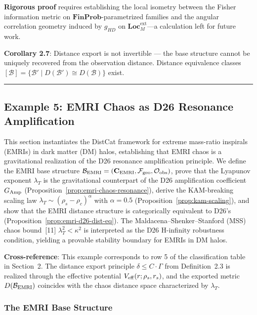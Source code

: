 \documentclass[
]{article}
\begin{document}
\textbf{Rigorous proof} requires establishing the local isometry between
the Fisher information metric on \(\mathbf{FinProb}\)-parametrized families
and the angular correlation geometry induced by \(g_{HD}\) on
\(\mathbf{Loc}_M^{\text{ext}}\)---a calculation left for future work.

\textbf{Corollary 2.7}: Distance export is not invertible --- the base
structure cannot be uniquely recovered from the observation distance.
Distance equivalence classes
\([\mathcal{B}] = \{\mathcal{B}' \mid D(\mathcal{B}') \cong D(\mathcal{B})\}\)
exist.

\begin{center}\rule{0.5\linewidth}{0.5pt}\end{center}


\subsection{Example 5: EMRI Chaos as D26 Resonance Amplification}\label{sec:example5-emri}

This section instantiates the DistCat framework for extreme mass-ratio inspirals (EMRIs) in dark matter (DM) halos, establishing that EMRI chaos is a gravitational realization of the D26 resonance amplification principle. We define the EMRI base structure $\mathcal{B}_{\rm EMRI} = (\mathbf{C}_{\rm EMRI}, \mathcal{F}_{\rm geo}, \mathcal{O}_{\rm obs})$, prove that the Lyapunov exponent $\lambda_T$ is the gravitational counterpart of the D26 amplification coefficient $G_{\rm Amp}$ (Proposition~\ref{prop:emri-chaos-resonance}), derive the KAM-breaking scaling law $\lambda_T \sim (\rho_s - \rho_c)^\alpha$ with $\alpha = 0.5$ (Proposition~\ref{prop:kam-scaling}), and show that the EMRI distance structure is categorically equivalent to D26's (Proposition~\ref{prop:emri-d26-dist-eq}). The Maldacena--Shenker--Stanford (MSS) chaos bound~[11] $\lambda_T^2 < \kappa^2$ is interpreted as the D26 H-infinity robustness condition, yielding a provable stability boundary for EMRIs in DM halos.

\textbf{Cross-reference}: This example corresponds to row 5 of the classification table in Section~2. The distance export principle $\delta \leq C \cdot \Gamma$ from Definition~2.3 is realized through the effective potential $V_{\rm eff}(r; \rho_s, r_s)$, and the exported metric $D(\mathcal{B}_{\rm EMRI})$ coincides with the chaos distance space characterized by $\lambda_T$.

\subsubsection{The EMRI Base Structure}\label{subsec:emri-base}
\end{document}
